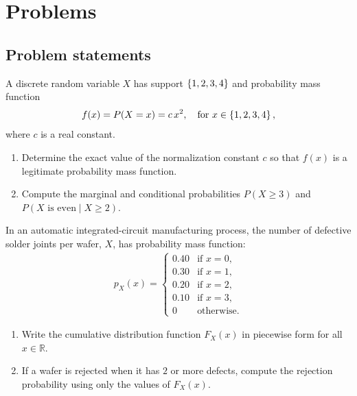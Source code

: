 \section*{Problems}

\subsection*{Problem statements}

\begin{problema}
	\label{prob:2c27c8e}
	A discrete random variable $X$ has support $\left\{ 1, 2, 3, 4 \right\}$ and probability mass function
	\begin{align*}
		f(x) = P(X = x) = c\, x^2, \quad \text{for } x \in \left\{ 1, 2, 3, 4 \right\},
	\end{align*}
	where $c$ is a real constant.
	\begin{enumerate}
		\item Determine the exact value of the normalization constant $c$ so that $f(x)$ is a legitimate probability mass function.
		\item Compute the marginal and conditional probabilities $P(X \ge 3)$ and $P(X \text{ is even} \mid X \ge 2)$.
	\end{enumerate}
\end{problema}

\begin{problema}
	\label{prob:9efeaae}
	In an automatic integrated-circuit manufacturing process, the number of defective solder joints per wafer, $X$, has probability mass function:
	\begin{align*}
		p_X(x) = \begin{cases}
			0.40 & \text{if } x = 0, \\
			0.30 & \text{if } x = 1, \\
			0.20 & \text{if } x = 2, \\
			0.10 & \text{if } x = 3, \\
			0 & \text{otherwise.}
		\end{cases}
	\end{align*}
	\begin{enumerate}
		\item Write the cumulative distribution function $F_X(x)$ in piecewise form for all $x \in \mathbb{R}$.
		\item If a wafer is rejected when it has $2$ or more defects, compute the rejection probability using only the values of $F_X(x)$.
	\end{enumerate}
\end{problema}

